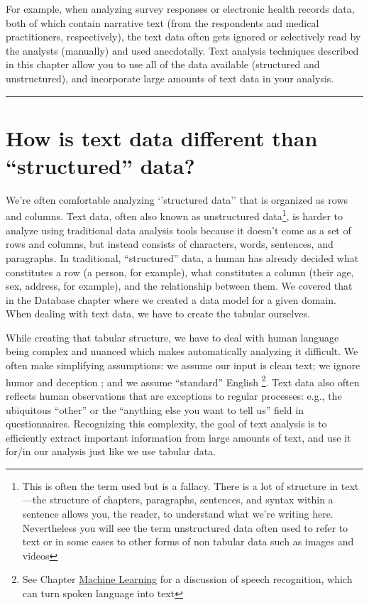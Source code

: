 \documentclass[]{krantz}
\begin{document}
For example, when analyzing survey responses or electronic health
records data, both of which contain narrative text (from the respondents
and medical practitioners, respectively), the text data often gets
ignored or selectively read by the analysts (manually) and used
anecdotally. Text analysis techniques described in this chapter allow
you to use all of the data available (structured and unstructured), and
incorporate large amounts of text data in your analysis.

\begin{center}\rule{0.5\linewidth}{\linethickness}\end{center}

\section{\texorpdfstring{How is text data different than ``structured''
data?}{How is text data different than structured data?}}\label{how-is-text-data-different-than-structured-data}

We're often comfortable analyzing `'structured data'' that is organized
as rows and columns. Text data, often also known as unstructured
data\footnote{This is often the term used but is a fallacy. There is a
  lot of structure in text---the structure of chapters, paragraphs,
  sentences, and syntax \citep{marcus-93} within a sentence allows you,
  the reader, to understand what we're writing here. Nevertheless you
  will see the term unstructured data often used to refer to text or in
  some cases to other forms of non tabular data such as images and
  videos}, is harder to analyze using traditional data analysis tools
because it doesn't come as a set of rows and columns, but instead
consists of characters, words, sentences, and paragraphs. In
traditional, ``structured'' data, a human has already decided what
constitutes a row (a person, for example), what constitutes a column
(their age, sex, address, for example), and the relationship between
them. We covered that in the Database chapter where we created a data
model for a given domain. When dealing with text data, we have to create
the tabular ourselves.

While creating that tabular structure, we have to deal with human
language being complex and nuanced which makes automatically analyzing
it difficult. We often make simplifying assumptions: we assume our input
is clean text; we ignore humor \citep{halevy-09} and deception
\citep{niculae-15, ott-11}; and we assume ``standard'' English
\citep{kong-14}\footnote{See Chapter \protect\hyperlink{chap:ml}{Machine
  Learning} for a discussion of speech recognition, which can turn
  spoken language into text}. Text data also often reflects human
observations that are exceptions to regular processes: e.g., the
ubiquitous ``other'' or the ``anything else you want to tell us'' field
in questionnaires. Recognizing this complexity, the goal of text
analysis is to efficiently extract important information from large
amounts of text, and use it for/in our analysis just like we use tabular
data.
\end{document}
